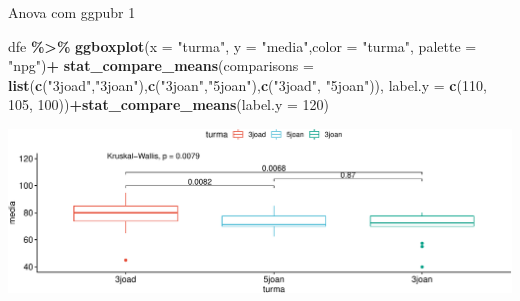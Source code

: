 \documentclass[
  9pt,
  ignorenonframetext,
  aspectratio=169]{beamer}
\newenvironment{Shaded}{\begin{snugshade}}{\end{snugshade}}
\newcommand{\DataTypeTok}[1]{\textcolor[rgb]{0.13,0.29,0.53}{#1}}
\newcommand{\DecValTok}[1]{\textcolor[rgb]{0.00,0.00,0.81}{#1}}
\newcommand{\KeywordTok}[1]{\textcolor[rgb]{0.13,0.29,0.53}{\textbf{#1}}}
\newcommand{\NormalTok}[1]{#1}
\newcommand{\OperatorTok}[1]{\textcolor[rgb]{0.81,0.36,0.00}{\textbf{#1}}}
\newcommand{\StringTok}[1]{\textcolor[rgb]{0.31,0.60,0.02}{#1}}
\begin{document}
\begin{frame}[fragile]{Anova com ggpubr 1}
\protect\hypertarget{anova-com-ggpubr-1}{}
\begin{Shaded}
\begin{Highlighting}[]
\NormalTok{dfe }\OperatorTok{\%\textgreater{}\%}\StringTok{ }
\StringTok{ }\KeywordTok{ggboxplot}\NormalTok{(}\DataTypeTok{x =} \StringTok{"turma"}\NormalTok{, }\DataTypeTok{y =} \StringTok{"media"}\NormalTok{,}\DataTypeTok{color =} \StringTok{"turma"}\NormalTok{, }\DataTypeTok{palette =} \StringTok{"npg"}\NormalTok{)}\OperatorTok{+}
\StringTok{ }\KeywordTok{stat\_compare\_means}\NormalTok{(}\DataTypeTok{comparisons =} 
                      \KeywordTok{list}\NormalTok{(}\KeywordTok{c}\NormalTok{(}\StringTok{"3joad"}\NormalTok{,}\StringTok{"3joan"}\NormalTok{),}\KeywordTok{c}\NormalTok{(}\StringTok{"3joan"}\NormalTok{,}\StringTok{"5joan"}\NormalTok{),}\KeywordTok{c}\NormalTok{(}\StringTok{"3joad"}\NormalTok{, }\StringTok{"5joan"}\NormalTok{)), }
                    \DataTypeTok{label.y =} \KeywordTok{c}\NormalTok{(}\DecValTok{110}\NormalTok{, }\DecValTok{105}\NormalTok{, }\DecValTok{100}\NormalTok{))}\OperatorTok{+}\KeywordTok{stat\_compare\_means}\NormalTok{(}\DataTypeTok{label.y =} \DecValTok{120}\NormalTok{)    }
\end{Highlighting}
\end{Shaded}

\includegraphics{aula_11_files/figure-beamer/unnamed-chunk-18-1.pdf}
\end{frame}
\end{document}

